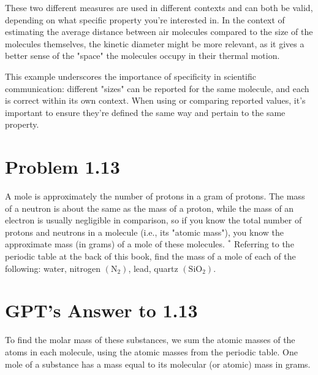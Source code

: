 \documentclass[12pt]{article}
\begin{document}
These two different measures are used in different contexts and can both be valid, depending on what specific property you're interested in. In the context of estimating the average distance between air molecules compared to the size of the molecules themselves, the kinetic diameter might be more relevant, as it gives a better sense of the "space" the molecules occupy in their thermal motion.

This example underscores the importance of specificity in scientific communication: different "sizes" can be reported for the same molecule, and each is correct within its own context. When using or comparing reported values, it's important to ensure they're defined the same way and pertain to the same property.

\section*{Problem 1.13}
 A mole is approximately the number of protons in a gram of protons. The mass of a neutron is about the same as the mass of a proton, while the mass of an electron is usually negligible in comparison, so if you know the total number of protons and neutrons in a molecule (i.e., its "atomic mass"), you know the approximate mass (in grams) of a mole of these molecules. ${ }^*$ Referring to the periodic table at the back of this book, find the mass of a mole of each of the following: water, nitrogen $\left(\mathrm{N}_2\right)$, lead, quartz $\left(\mathrm{SiO}_2\right)$.

\section*{GPT's Answer to 1.13}

To find the molar mass of these substances, we sum the atomic masses of the atoms in each molecule, using the atomic masses from the periodic table. One mole of a substance has a mass equal to its molecular (or atomic) mass in grams.
\end{document}
